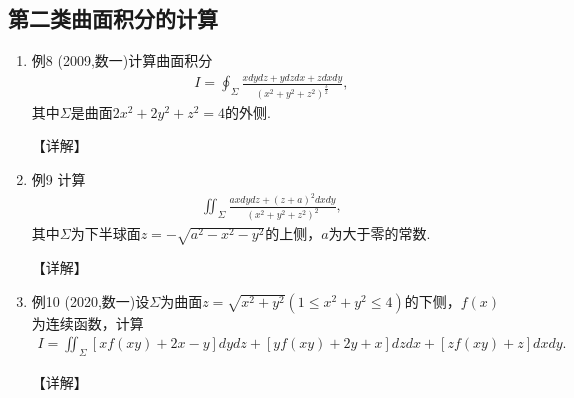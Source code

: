 \documentclass[12pt, a4paper, oneside, UTF8]{ctexbook}
\begin{document}
\subsection{第二类曲面积分的计算}

\begin{remark}[方法]
\end{remark}

\begin{enumerate}[label=\arabic*.,start=8]
    \item 例8 (2009,数一)计算曲面积分
    \begin{align*}
    I=\oint_{\Sigma}\frac{xdydz+ydzdx+zdxdy}{(x^2+y^2+z^2)^{\frac{3}{2}}},
    \end{align*}
    其中$\Sigma$是曲面$2x^2+2y^2+z^2=4$的外侧.
    
    \begin{solution}
    【详解】
    \end{solution}
    
    \item 例9 计算
    \begin{align*}
    \iint_{\Sigma}\frac{axdydz+(z+a)^2dxdy}{(x^2+y^2+z^2)^2},
    \end{align*}
    其中$\Sigma$为下半球面$z=-\sqrt{a^2-x^2-y^2}$的上侧，$a$为大于零的常数.
    
    \begin{solution}
    【详解】
    \end{solution}
    
    \item 例10 (2020,数一)设$\Sigma$为曲面$z=\sqrt{x^2+y^2}(1\leq x^2+y^2\leq 4)$的下侧，$f(x)$为连续函数，计算
    \begin{align*}
    I=\iint_{\Sigma}[xf(xy)+2x-y]dydz+[yf(xy)+2y+x]dzdx+[zf(xy)+z]dxdy.
    \end{align*}
    
    \begin{solution}
    【详解】
    \end{solution}
\end{enumerate}

\ifx\allfiles\undefined
\end{document}
